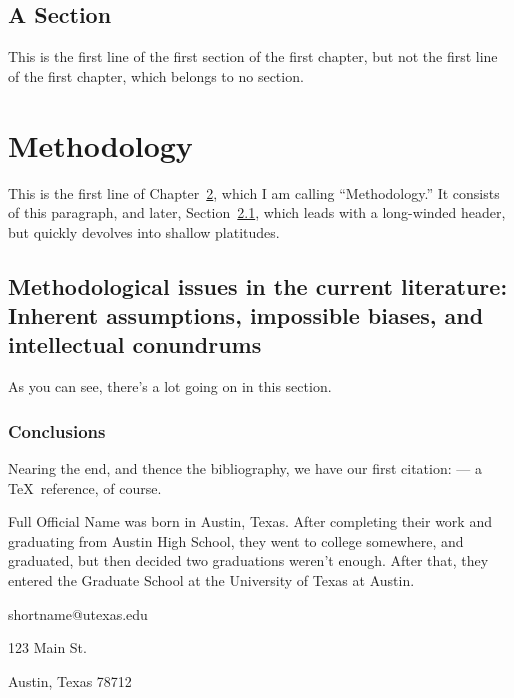 \documentclass{utexasthesis}
\begin{document}
\section{A Section}

This is the first line of the first section of the first chapter, but not the first line of the first chapter, which belongs to no section.


\chapter{Methodology}
\label{chap:methodology}

This is the first line of Chapter~\ref{chap:methodology}, which I am calling ``Methodology.''
It consists of this paragraph, and later, Section~\ref{sec:method-issues}, which leads with a long-winded header, but quickly devolves into shallow platitudes.

\section{Methodological issues in the current literature: Inherent assumptions, impossible biases, and intellectual conundrums}
\label{sec:method-issues}

As you can see, there's a lot going on in this section.

\subsection{Conclusions}

Nearing the end, and thence the bibliography, we have our first citation: \citet{knuth:texbook} --- a \TeX\ reference, of course.


\begin{vita}
  Full Official Name was born in Austin, Texas. After completing their work and graduating from Austin High School, they went to college somewhere, and graduated, but then decided two graduations weren't enough.
  After that, they entered the Graduate School at the University of Texas at Austin.

  \begin{address}
    shortname@utexas.edu

    123 Main St.

    Austin, Texas 78712
  \end{address}

\end{vita}
\end{document}
